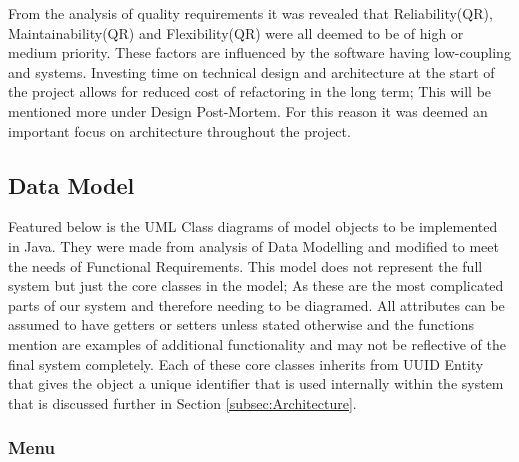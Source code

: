 From the analysis of quality requirements it was revealed that Reliability(QR), Maintainability(QR) and Flexibility(QR) were all deemed to be of high or medium priority. These factors are influenced by the software having low-coupling and  systems. Investing time on technical design and architecture at the start of the project allows for reduced cost of refactoring in the long term; This will be mentioned more under Design Post-Mortem. For this reason it was deemed an important focus on architecture throughout the project.

\subsection{Data Model} \label{subsec:DataModel}
Featured below is the UML Class diagrams of model objects to be implemented in Java. They were made from analysis of Data Modelling and modified to meet the needs of Functional Requirements. This model does not represent the full system but just the core classes in the model; As these are the most complicated parts of our system and therefore needing to be diagramed. All attributes can be assumed to have getters or setters unless stated otherwise and the functions mention are examples of additional functionality and may not be reflective of the final system completely.
Each of these core classes inherits from UUID Entity that gives the object a unique identifier that is used internally within the system that is discussed further in Section \ref{subsec:Architecture}.

\subsubsection{Menu}

